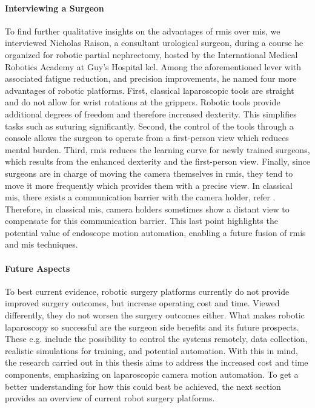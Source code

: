 \paragraph{Interviewing a Surgeon} To find further qualitative insights on the advantages of \gls{rmis} over \gls{mis}, we interviewed Nicholas Raison, a consultant urological surgeon, during a course he organized for robotic partial nephrectomy, hosted by the International Medical Robotics Academy at Guy's Hospital \gls{kcl}. Among the aforementioned lever with associated fatigue reduction, and precision improvements, he named four more advantages of robotic platforms. First, classical laparoscopic tools are straight and do not allow for wrist rotations at the grippers. Robotic tools provide additional degrees of freedom and therefore increased dexterity. This simplifies tasks such as suturing significantly. Second, the control of the tools through a console allows the surgeon to operate from a first-person view which reduces mental burden. Third, \gls{rmis} reduces the learning curve for newly trained surgeons, which results from the enhanced dexterity and the first-person view.
Finally, since surgeons are in charge of moving the camera themselves in \gls{rmis}, they tend to move it more frequently which provides them with a precise view. In classical \gls{mis}, there exists a communication barrier with the camera holder, refer . Therefore, in classical \gls{mis}, camera holders sometimes show a distant view to compensate for this communication barrier. This last point highlights the potential value of endoscope motion automation, enabling a future fusion of \gls{rmis} and \gls{mis} techniques. 

\paragraph{Future Aspects} To best current evidence, robotic surgery platforms currently do not provide  improved surgery outcomes, but increase operating cost and time. Viewed differently, they do not worsen the surgery outcomes either. What makes robotic laparoscopy so successful are the surgeon side benefits and its future prospects. These e.g. include the possibility to control the systems remotely, data collection, realistic simulations for training, and potential automation. With this in mind, the research carried out in this thesis aims to address the increased cost and  time components, emphasizing on laparoscopic camera motion automation. To get a better understanding for how this could best be achieved, the next section provides an overview of current robot surgery platforms.

